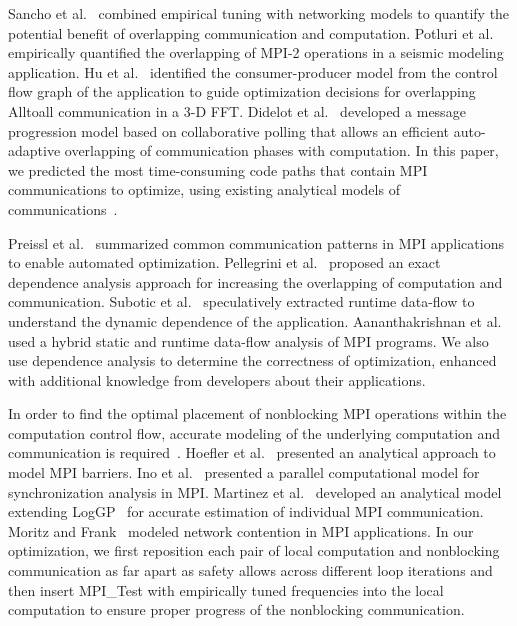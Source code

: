 Sancho et al.~\cite{sancho:sc06} combined empirical tuning with
networking models to quantify the potential benefit of overlapping
communication and computation.
Potluri et al.~\cite{potluri:ics10} empirically quantified the
overlapping of MPI-2 operations in a seismic modeling application.  Hu
et al.~\cite{hu:npc08,song:ppopp14} identified the consumer-producer
model from the control flow graph of the application to guide
optimization decisions for overlapping Alltoall communication in a 3-D
FFT.  Didelot et al.~\cite{didelot:imc14,didelot:eurompi12} developed
a message progression model based on collaborative polling that allows
an efficient auto-adaptive overlapping of communication phases with
computation.  In this paper, we predicted the most time-consuming
code paths that contain MPI communications to
optimize, using existing analytical models of
communications~\cite{loggp}.

Preissl et al.~\cite{preissl:tms10} summarized common communication
patterns in MPI applications to enable automated optimization.
Pellegrini et al.~\cite{pellegrini:eurompi12} proposed an exact
dependence analysis approach for increasing the overlapping of
computation and communication.  Subotic et al.~\cite{subotic:hipeac08}
speculatively extracted runtime data-flow to understand the dynamic
dependence of the application.  Aananthakrishnan et
al.~\cite{aananthakrishnan:ics13} used a hybrid static and runtime
data-flow analysis of MPI programs.  We also use dependence analysis
to determine the correctness of optimization, enhanced with additional
knowledge from developers about their applications.

In order to find the optimal placement of nonblocking MPI operations
within the computation control flow, accurate modeling of the
underlying computation and communication is
required~\cite{brightwell:ics04}.  Hoefler et
al.~\cite{hoefler:icppw05} presented an analytical approach to model
MPI barriers.  Ino et al.~\cite{ino:ppopp2001} presented a parallel
computational model for synchronization analysis in MPI.  Martinez et
al.~\cite{martinez:ipdps09} developed an analytical model extending
LogGP~\cite{loggp} for accurate estimation of individual MPI
communication.  Moritz and Frank~\cite{moritz:tpds01} modeled network
contention in MPI applications.  In our optimization, we first
reposition each pair of local computation and nonblocking
communication as far apart as safety allows across different loop
iterations and then insert MPI\_Test with empirically tuned frequencies
into the local computation to ensure proper progress of the
nonblocking communication.
